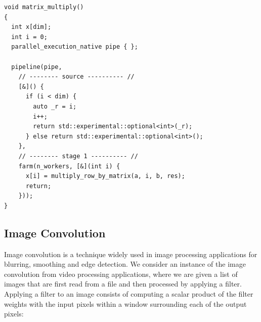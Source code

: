 \begin{small}
  \begin{lstlisting}[caption=GrPPI Matrix Multiplication\label{lst:matmult_grppi}]
void matrix_multiply()
{
  int x[dim];
  int i = 0;
  parallel_execution_native pipe { };

  pipeline(pipe,
    // -------- source ---------- //
    [&]() {
      if (i < dim) {
        auto _r = i;
        i++;
        return std::experimental::optional<int>(_r);
      } else return std::experimental::optional<int>();
    },
    // -------- stage 1 ---------- //
    farm(n_workers, [&](int i) {
      x[i] = multiply_row_by_matrix(a, i, b, res);
      return;
    }));
}
  \end{lstlisting}  
\end{small}

\begin{figure}[t]
  \centering
{}
\end{figure}


\subsection{Image Convolution}

Image convolution is a technique widely used in image processing applications for
blurring, smoothing and edge detection. We consider an instance of the image
convolution from video processing applications, where we are given a list of images
that are first read from a file and then processed by applying 
a filter. Applying a filter to an image consists of computing a scalar
product of the filter weights with the input pixels within a window surrounding each of
the output pixels:


